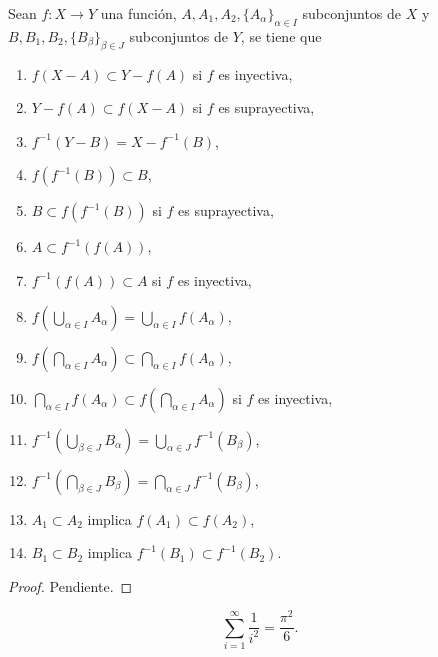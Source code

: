 

\begin{theorem}
Sean $f : X \longrightarrow Y$ una función, $A, A_1, A_2, \{ A_{\alpha} \}_{\alpha \in I}$ subconjuntos de $X$ y $B, B_1, B_2, \{ B_{\beta} \}_{\beta \in J}$ subconjuntos de $Y$, se tiene que

\begin{multicols}{2}
    \begin{enumerate}[label=\textnormal{(\roman*)}, align=left, labelwidth=2.0em, leftmargin=3.0em]
    \item $f(X - A) \subset Y - f(A)$ si $f$ es inyectiva,
    \item $Y - f(A) \subset f(X - A)$ si $f$ es suprayectiva,
    \item $f^{-1}(Y - B) = X - f^{-1}(B)$,
    \item $f(f^{-1}(B)) \subset B$,
    \item $B \subset f(f^{-1}(B))$ si $f$ es suprayectiva,
    \item $A \subset f^{-1}(f(A))$,
    \item $f^{-1}(f(A)) \subset A$ si $f$ es inyectiva,
    \columnbreak
    \item $f \left( \bigcup_{\alpha \in I} A_{\alpha} \right) = \bigcup_{\alpha \in I} f(A_{\alpha})$,
    \item $f \left( \bigcap_{\alpha \in I} A_{\alpha} \right) \subset \bigcap_{\alpha \in I} f(A_{\alpha})$,
    \item $\bigcap_{\alpha \in I} f(A_{\alpha}) \subset f \left( \bigcap_{\alpha \in I} A_{\alpha} \right)$ si $f$ es inyectiva,
    \item $f^{-1} \left( \bigcup_{\beta \in J} B_{\alpha} \right) = \bigcup_{\alpha \in J} f^{-1}(B_{\beta})$,
    \item $f^{-1}\left( \bigcap_{\beta \in J} B_{\beta} \right) = \bigcap_{\alpha \in J} f^{-1}(B_{\beta})$,
    \item $A_1 \subset A_2$ implica $f(A_1) \subset f(A_2)$,
    \item $B_1 \subset B_2$ implica $f^{-1}(B_1) \subset f^{-1}(B_2)$.
    \end{enumerate}
\end{multicols}
\end{theorem}

\begin{proof}
Pendiente.
\end{proof}

\begin{equation*}
    \sum_{i=1}^{\infty} \frac{1}{i^2} = \frac{\pi^2}{6}.
\end{equation*}
